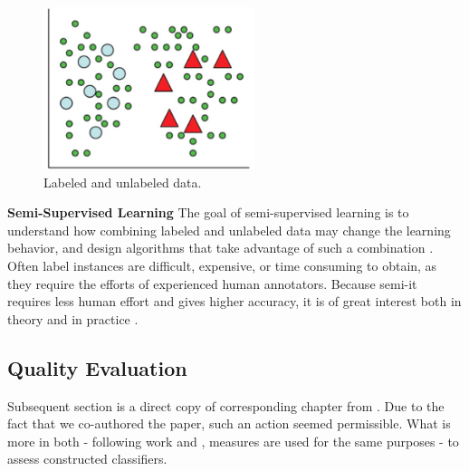 \documentclass{mini}
\begin{document}
\begin{figure}
  \begin{center}
    \includegraphics[width=0.55\textwidth]{images/semi_supervised_graph.png}
  \end{center}
  \caption{Labeled and unlabeled data.}
  \label{fig:handwritten_ex}
\end{figure}

\textbf{Semi-Supervised Learning} The goal of semi-supervised learning is to understand how combining labeled and unlabeled data may change the learning behavior, and design algorithms that take advantage of such a combination \cite{semi_supervised}. Often label instances are difficult, expensive, or time consuming to obtain, as they require the efforts of experienced human annotators. Because semi-it requires less human effort and gives higher accuracy, it is of great interest both in theory and in practice \cite{semi_supervised2}.


\pagebreak
\paragraph{}
\subsection{Quality Evaluation}\label{evaluation}
Subsequent section is a direct copy of corresponding chapter from \cite{rejector_geo}. Due to the fact that we co-authored the paper, such an action seemed permissible. What is more in both - following work and \cite{rejector_geo}, measures are used for the same purposes - to assess constructed classifiers. %
\end{document}
